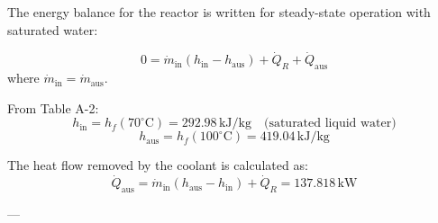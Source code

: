 The energy balance for the reactor is written for steady-state operation with saturated water:  

\[
0 = \dot{m}_{\text{in}} (h_{\text{in}} - h_{\text{aus}}) + \dot{Q}_R + \dot{Q}_{\text{aus}}
\]
where \( \dot{m}_{\text{in}} = \dot{m}_{\text{aus}} \).  

From Table A-2:  
\[
h_{\text{in}} = h_f(70^\circ\text{C}) = 292.98 \, \text{kJ/kg} \quad \text{(saturated liquid water)}
\]  
\[
h_{\text{aus}} = h_f(100^\circ\text{C}) = 419.04 \, \text{kJ/kg}
\]  

The heat flow removed by the coolant is calculated as:  
\[
\dot{Q}_{\text{aus}} = \dot{m}_{\text{in}} (h_{\text{aus}} - h_{\text{in}}) + \dot{Q}_R = 137.818 \, \text{kW}
\]  

---